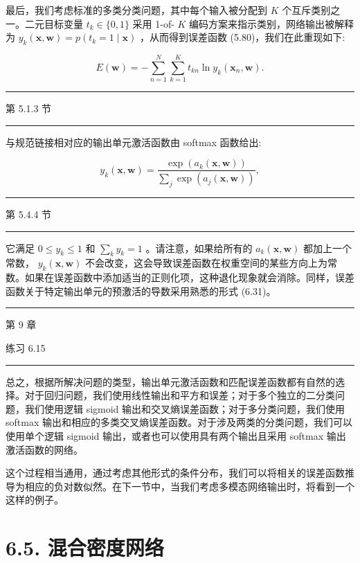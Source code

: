 \documentclass[10pt]{report}
\newcommand{\HRule}{\begin{center}\rule{0.9\linewidth}{0.2mm}\end{center}}
\begin{document}
最后，我们考虑标准的多类分类问题，其中每个输入被分配到 \(K\) 个互斥类别之一。二元目标变量 \({t}_{k} \in  \{ 0,1\}\) 采用 1-of- \(K\) 编码方案来指示类别，网络输出被解释为 \({y}_{k}\left( {\mathbf{x},\mathbf{w}}\right)  = p\left( {{t}_{k} = 1 \mid  \mathbf{x}}\right)\) ，从而得到误差函数 (5.80)，我们在此重现如下:

\[
E\left( \mathbf{w}\right)  =  - \mathop{\sum }\limits_{{n = 1}}^{N}\mathop{\sum }\limits_{{k = 1}}^{K}{t}_{kn}\ln {y}_{k}\left( {{\mathbf{x}}_{n},\mathbf{w}}\right) . \tag{6.36}
\]

\HRule

第 5.1.3 节

\HRule

与规范链接相对应的输出单元激活函数由 softmax 函数给出:

\[
{y}_{k}\left( {\mathbf{x},\mathbf{w}}\right)  = \frac{\exp \left( {{a}_{k}\left( {\mathbf{x},\mathbf{w}}\right) }\right) }{\mathop{\sum }\limits_{j}\exp \left( {{a}_{j}\left( {\mathbf{x},\mathbf{w}}\right) }\right) }, \tag{6.37}
\]

\HRule

第 5.4.4 节

\HRule

它满足 \(0 \leq  {y}_{k} \leq  1\) 和 \(\mathop{\sum }\limits_{k}{y}_{k} = 1\) 。请注意，如果给所有的 \({a}_{k}\left( {\mathbf{x},\mathbf{w}}\right)\) 都加上一个常数， \({y}_{k}\left( {\mathbf{x},\mathbf{w}}\right)\) 不会改变，这会导致误差函数在权重空间的某些方向上为常数。如果在误差函数中添加适当的正则化项，这种退化现象就会消除。同样，误差函数关于特定输出单元的预激活的导数采用熟悉的形式 (6.31)。

\HRule

第 9 章

练习 6.15

\HRule

总之，根据所解决问题的类型，输出单元激活函数和匹配误差函数都有自然的选择。对于回归问题，我们使用线性输出和平方和误差；对于多个独立的二分类问题，我们使用逻辑 sigmoid 输出和交叉熵误差函数；对于多分类问题，我们使用 softmax 输出和相应的多类交叉熵误差函数。对于涉及两类的分类问题，我们可以使用单个逻辑 sigmoid 输出，或者也可以使用具有两个输出且采用 softmax 输出激活函数的网络。

这个过程相当通用，通过考虑其他形式的条件分布，我们可以将相关的误差函数推导为相应的负对数似然。在下一节中，当我们考虑多模态网络输出时，将看到一个这样的例子。

\section*{6.5. 混合密度网络}
\end{document}

